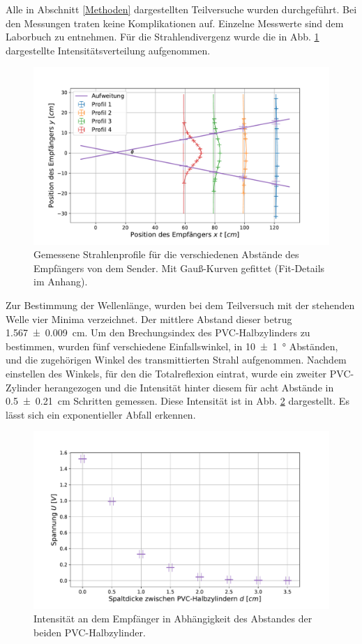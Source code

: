 		Alle in Abschnitt \ref{Methoden} dargestellten Teilversuche wurden durchgeführt.
		Bei den Messungen traten keine Komplikationen auf.
		Einzelne Messwerte sind dem Laborbuch zu entnehmen.
		Für die Strahlendivergenz wurde die in Abb. \ref{fig:divergenz} dargestellte Intensitätsverteilung aufgenommen. 
		\begin{figure}[ht]
			\centering
			\includegraphics[width=\textwidth]{data/profil.pdf}
			\caption{Gemessene Strahlenprofile für die verschiedenen Abstände des Empfängers von dem Sender. Mit Gauß-Kurven gefittet (Fit-Details im Anhang).}
			\label{fig:divergenz}	
		\end{figure}
		Zur Bestimmung der Wellenlänge, wurden bei dem Teilversuch mit der stehenden Welle vier Minima verzeichnet.
		Der mittlere Abstand dieser betrug \SI{1,567+-0,009}{\centi\meter}.
		Um den Brechungsindex des PVC-Halbzylinders zu bestimmen, wurden fünf verschiedene Einfallswinkel, in \SI{10+-1}{\degree} Abständen, und die zugehörigen Winkel des transmittierten Strahl aufgenommen.
		Nachdem einstellen des Winkels, für den die Totalreflexion eintrat, wurde ein zweiter PVC-Zylinder herangezogen und die Intensität hinter diesem für acht Abstände in \SI{0,5+-0,21}{\centi\meter} Schritten gemessen.
		Diese Intensität ist in Abb. \ref{fig:totalreflexion} dargestellt.
		Es lässt sich ein exponentieller Abfall erkennen.
		\begin{figure}[ht]
			\centering
			\includegraphics[width=\textwidth]{data/totalreflektion.pdf}
			\caption{Intensität an dem Empfänger in Abhängigkeit des Abstandes der beiden PVC-Halbzylinder.}
			\label{fig:totalreflexion}	
		\end{figure}
